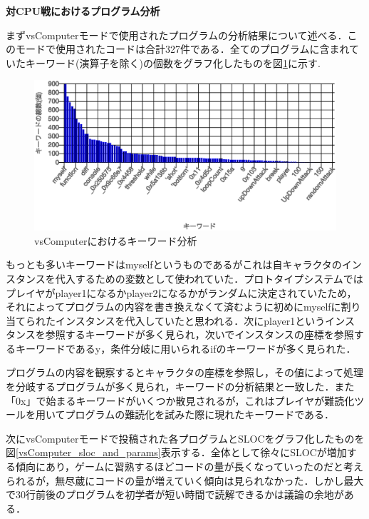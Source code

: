 \vspace{10truept}
\noindent
{\bf 対CPU戦におけるプログラム分析}

まずvsComputerモードで使用されたプログラムの分析結果について述べる．このモードで使用されたコードは合計327件である．全てのプログラムに含まれていたキーワード(演算子を除く)の個数をグラフ化したものを図\ref{vsComputer_keyword}に示す.

\begin{figure}[!b]
  \begin{center}
    \includegraphics[width=0.9\linewidth]{image/vsComputer_keyword.eps}
  \end{center}
    \vspace{-8mm} 
  \caption{vsComputerにおけるキーワード分析}
  \label{vsComputer_keyword}
\end{figure}

もっとも多いキーワードはmyselfというものであるがこれは自キャラクタのインスタンスを代入するための変数として使われていた．プロトタイプシステムではプレイヤがplayer1になるかplayer2になるかがランダムに決定されていたため，それによってプログラムの内容を書き換えなくて済むように初めにmyselfに割り当てられたインスタンスを代入していたと思われる．次にplayer1というインスタンスを参照するキーワードが多く見られ，次いでインスタンスの座標を参照するキーワードであるy，条件分岐に用いられるifのキーワードが多く見られた．

プログラムの内容を観察するとキャラクタの座標を参照し，その値によって処理を分岐するプログラムが多く見られ，キーワードの分析結果と一致した．また「0x」で始まるキーワードがいくつか散見されるが，これはプレイヤが難読化ツールを用いてプログラムの難読化を試みた際に現れたキーワードである．


次にvsComputerモードで投稿された各プログラムとSLOCをグラフ化したものを図\ref{vsComputer_sloc_and_params}表示する．全体として徐々にSLOCが増加する傾向にあり，ゲームに習熟するほどコードの量が長くなっていったのだと考えられるが，無尽蔵にコードの量が増えていく傾向は見られなかった．しかし最大で30行前後のプログラムを初学者が短い時間で読解できるかは議論の余地がある．

